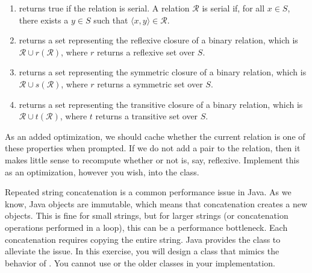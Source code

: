 \begin{enumerate}[label=(\alph*)]
    \item {} returns true if the relation is serial. A relation $\mathcal{R}$ is serial if, for all $x \in S$, there exists a $y \in S$ such that $\langle{x, y}\rangle \in \mathcal{R}$.

    \item {} returns a set representing the reflexive closure of a binary relation, which is $\mathcal{R} \cup r(\mathcal{R})$, where $r$ returns a reflexive set over $S$.
    
    \item {} returns a set representing the symmetric closure of a binary relation, which is $\mathcal{R} \cup s(\mathcal{R})$, where $r$ returns a symmetric set over $S$.

    \item {} returns a set representing the transitive closure of a binary relation, which is $\mathcal{R} \cup t(\mathcal{R})$, where $t$ returns a transitive set over $S$.
\end{enumerate}

As an added optimization, we should cache whether the current relation is one of these properties when prompted. If we do not add a pair to the relation, then it makes little sense to recompute whether or not is, say, reflexive. Implement this as an optimization, however you wish, into the class.

Repeated string concatenation is a common performance issue in Java. 
As we know, Java  objects are immutable, which means that concatenation creates a new  objects. 
This is fine for small strings, but for larger strings (or concatenation operations performed in a loop), this can be a performance bottleneck. 
Each concatenation requires copying the entire string. 
Java provides the  class to alleviate the issue. 
In this exercise, you will design a  class that mimics the behavior of . 
You cannot use  or the older  classes in your implementation.

